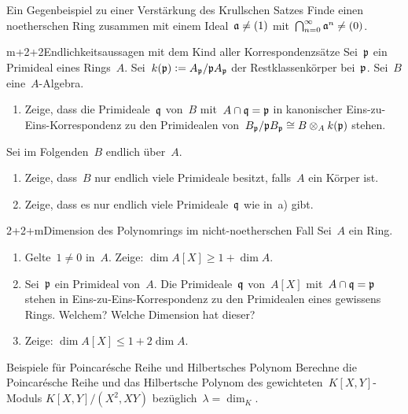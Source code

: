 \documentclass{uebblatt}
\begin{document}
\enlargethispage{1em}

\begin{aufgabe}{2}{Ein Gegenbeispiel zu einer Verstärkung des Krullschen Satzes}
Finde einen noetherschen Ring zusammen mit einem Ideal~$\mathfrak{a} \neq (1)$
mit~$\bigcap_{n=0}^\infty \mathfrak{a}^n \neq (0)$.
\end{aufgabe}

\begin{aufgabe}{m+2+2}{Endlichkeitsaussagen mit dem Kind aller Korrespondenzsätze}
Sei~$\mathfrak{p}$ ein Primideal eines Rings~$A$. Sei~$k(\mathfrak{p}) \vcentcolon= A_{\mathfrak{p}}/\mathfrak{p} A_{\mathfrak{p}}$
der Restklassenkörper bei~$\mathfrak{p}$. Sei~$B$ eine~$A$-Algebra.
\begin{enumerate}
\item Zeige, dass die Primideale~$\mathfrak{q}$
von~$B$ mit~$A \cap \mathfrak{q} = \mathfrak{p}$ in kanonischer Eins-zu-Eins-Korrespondenz zu
den Primidealen von~$B_{\mathfrak{p}}/\mathfrak{p} B_{\mathfrak{p}} \cong B \otimes_A k(\mathfrak{p})$ stehen.
\end{enumerate}
Sei im Folgenden~$B$ endlich über~$A$.
\begin{enumerate}
\addtocounter{enumi}{1}
\item Zeige, dass~$B$ nur endlich
viele Primideale besitzt, falls~$A$ ein Körper ist.
\item Zeige, dass es nur endlich viele
Primideale~$\mathfrak{q}$ wie in~a) gibt.
\end{enumerate}
\end{aufgabe}

\begin{aufgabe}{2+2+m}{Dimension des Polynomrings im nicht-noetherschen Fall}
Sei~$A$ ein Ring.
\begin{enumerate}
\item Gelte~$1 \neq 0$ in~$A$. Zeige: $\dim A[X] \geq 1 + \dim A$.
\item Sei~$\mathfrak{p}$ ein Primideal von~$A$. Die Primideale~$\mathfrak{q}$
von~$A[X]$ mit~$A \cap \mathfrak{q} = \mathfrak{p}$ stehen in Eins-zu-Eins-Korrespondenz zu den
Primidealen eines gewissens Rings. Welchem? Welche Dimension hat dieser?
\item Zeige: $\dim A[X] \leq 1 + 2 \dim A$.
\end{enumerate}
\end{aufgabe}

\begin{aufgabe}{3}{Beispiele für Poincarésche Reihe und Hilbertsches Polynom}
Berechne die Poincarésche Reihe und das Hilbertsche Polynom des
gewichteten~$K[X,Y]$-Moduls $K[X,Y]/(X^2, XY)$ bezüglich~$\lambda = \dim_K$.
\end{aufgabe}
\end{document}
